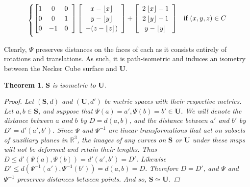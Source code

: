 \documentclass[]{article}
\newtheorem{thm}{Theorem}[subsection]
\begin{document}
\begin{equation}
\begin{cases}
		\left[ \begin{matrix}
		1 & 0 & 0 \\
		0 & 0 & 1 \\
		0 & -1 & 0
		\end{matrix}\hspace{2mm}\right]
		\left[\begin{array}{c}
			x - \left\lfloor x \right\rfloor
			\\ y- \left\lfloor y \right\rfloor
			\\ -(z - \left\lfloor z \right\rfloor)
			\end{array} \right]
		+
			\left[\begin{array}{c}
				2 \left\lfloor x \right\rfloor - 1
				\\ 2\left\lfloor y \right\rfloor - 1
				\\ y - \left\lfloor y \right\rfloor
			\end{array} \right]
				& \text{if } (x,y,z)\in C	\vspace{2mm}
\end{cases}
\end{equation}

Clearly, $\Psi$ preserves distances on the faces of each as it consists entirely of rotations and translations. As such, it is path-isometric and induces an isometry between the Necker Cube surface and $\mathbf U$.

\begin{thm}{$\mathbf{S}$ is isometric to  $\mathbf{U}$.}
\begin{proof}

Let $(\mathbf{S}, d)$ and $(\mathbf{U}, d')$ be metric spaces with their respective metrics. Let $a,b\in\mathbf{S}$, and suppose that $\Psi(a)=a',\Psi(b)=b'\in\mathbf{U}$. We will denote the distance between $a$ and $b$ by $D=d(a,b)$, and the distance between $a'$ and $b'$ by $D'=d'(a',b')$. Since $\Psi$ and $\Psi^{-1}$ are linear transformations that act on subsets of auxiliary planes in $\mathbb{R}^{3}$, the images of any curves on $\mathbf{S}$ or $\mathbf{U}$ under these maps will not be deformed and retain their lengths. Thus $D \leq d'(\Psi(a), \Psi(b)) = d'(a',b') = D'$. Likewise $D' \leq d(\Psi^{-1}(a'),\Psi^{-1}(b')) = d(a,b) = D$. Therefore $D=D'$, and $\Psi$ and $\Psi^{-1}$ preserves distances between points. And so, $\mathbf{S}\simeq\mathbf{U}$.
\end{proof} 
\end{thm}
\end{document}

